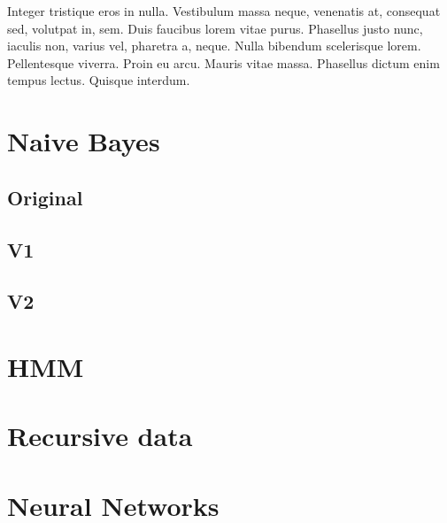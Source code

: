 Integer tristique eros in nulla. Vestibulum massa neque, venenatis at, consequat sed, volutpat in, 
sem. Duis faucibus lorem vitae purus. Phasellus justo nunc, iaculis non, varius vel, pharetra a, 
neque. Nulla bibendum scelerisque lorem. Pellentesque viverra. Proin eu arcu. Mauris vitae massa. 
Phasellus dictum enim tempus lectus. Quisque interdum.

\section{Naive Bayes}
\subsection{Original}
\subsection{V1} 	
\subsection{V2}

\section{HMM}

\section{Recursive data}

\section{Neural Networks}